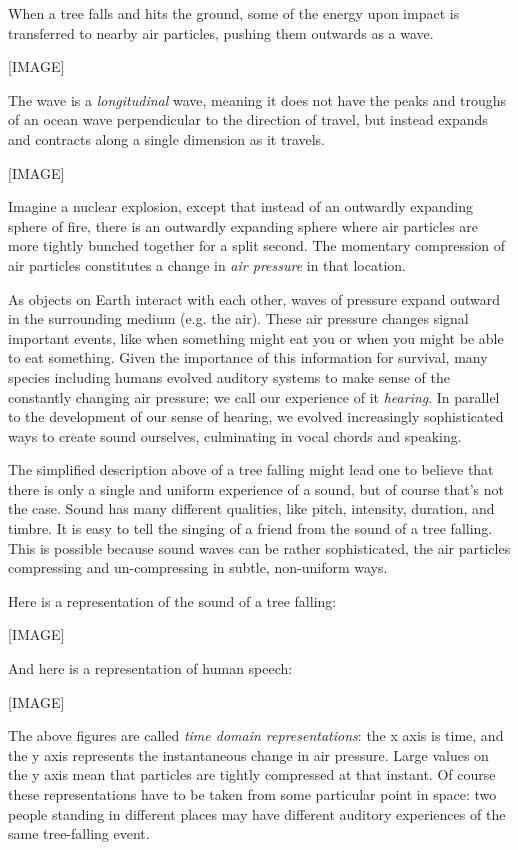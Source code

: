 \documentclass[UTF8]{book}
\begin{document}
\begin{CJK}{UTF8}{gbsn}
When a tree falls and hits the ground, some of the energy upon impact is transferred to nearby air particles, pushing them outwards as a wave.

[IMAGE]

The wave is a \emph{longitudinal} wave, meaning it does not have the peaks and troughs of an ocean wave perpendicular to the direction of travel, but instead expands and contracts along a single dimension as it travels.

[IMAGE]

Imagine a nuclear explosion, except that instead of an outwardly expanding sphere of fire, there is an outwardly expanding sphere where air particles are more tightly bunched together for a split second. The momentary compression of air particles constitutes a change in \emph{air pressure} in that location.

As objects on Earth interact with each other, waves of pressure expand outward in the surrounding medium (e.g. the air). These air pressure changes signal important events, like when something might eat you or when you might be able to eat something. Given the importance of this information for survival, many species including humans evolved auditory systems to make sense of the constantly changing air pressure; we call our experience of it \emph{hearing}. In parallel to the development of our sense of hearing, we evolved increasingly sophisticated ways to create sound ourselves, culminating in vocal chords and speaking.

The simplified description above of a tree falling might lead one to believe that there is only a single and uniform experience of a sound, but of course that's not the case. Sound has many different qualities, like pitch, intensity, duration, and timbre. It is easy to tell the singing of a friend from the sound of a tree falling. This is possible because sound waves can be rather sophisticated, the air particles compressing and un-compressing in subtle, non-uniform ways.

Here is a representation of the sound of a tree falling:

[IMAGE]

And here is a representation of human speech:

[IMAGE]

The above figures are called \emph{time domain representations}: the x axis is time, and the y axis represents the instantaneous change in air pressure. Large values on the y axis mean that particles are tightly compressed at that instant. Of course these representations have to be taken from some particular point in space: two people standing in different places may have different auditory experiences of the same tree-falling event.


\end{CJK}
\end{document}
